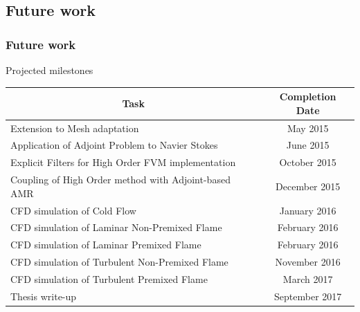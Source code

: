 \documentclass{beamer}
\begin{document}
\subsection[Future]{Future work}
\begin{frame}%
\frametitle{Future work}
\scriptsize


\begin{minipage}[t][1\textheight]{1\textwidth}
\vspace{-20pt}
\begin{exampleblock}{Projected milestones}

\begin{tabular}{|l|c|} \hline
\multicolumn{1}{|c|}{\bf{Task}} & \multicolumn{1}{|c|}{\bf{Completion Date}} \\

\hline Extension to Mesh adaptation & May 2015\\

\hline Application of Adjoint Problem to Navier Stokes  & June 2015\\

\hline Explicit Filters for High Order FVM implementation  & October 2015\\

\hline Coupling of High Order method with Adjoint-based AMR & December 2015\\

\hline CFD simulation of Cold Flow & January 2016\\

\hline CFD simulation of Laminar Non-Premixed Flame & February 2016\\

\hline CFD simulation of Laminar Premixed Flame & February 2016\\

\hline CFD simulation of Turbulent Non-Premixed Flame & November 2016\\

\hline CFD simulation of Turbulent Premixed Flame & March 2017\\

\hline Thesis write-up & September 2017 \\ 

\hline

\end{tabular}

\end{exampleblock}
\end{minipage}

\end{frame}
\end{document}
